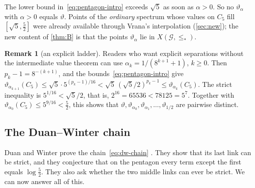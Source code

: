\documentclass[11pt]{article}
\theoremstyle{definition}
\newtheorem{remark}[theorem]{Remark}
\newcommand{\vt}{\vartheta}
\newcommand{\cG}{\mathcal G}
\newcommand{\Xs}{X(\cG,\le_*)}
\begin{document}
The lower bound in~\eqref{eq:pentagon-intro} exceeds $\sqrt5$ as soon as
$\alpha>0$.  So no $\vt_\alpha$ with $\alpha>0$ equals $\vt$.  Points of the
\emph{ordinary} spectrum whose values on $C_5$ fill $[\sqrt5,\frac52]$ were
already available through Vrana's interpolation (\cref{sec:new}); the new
content of \cref{thm:B} is that the points $\vt_\alpha$ lie in $\Xs$.

\begin{remark}[an explicit ladder]
Readers who want explicit separations without the intermediate value theorem
can use $\alpha_k=1/(8^{k+1}+1)$, $k\ge0$.  Then $p_k-1=8^{-(k+1)}$, and the
bounds~\eqref{eq:pentagon-intro} give
$\vt_{\alpha_{k+1}}(C_5)\le\sqrt5\cdot5^{(p_k-1)/16}
<\sqrt5\,(\sqrt5/2)^{p_k-1}\le\vt_{\alpha_k}(C_5)$.  The strict inequality is
$5^{1/16}<\sqrt5/2$, that is, $2^{16}=65536<78125=5^7$.  Together with
$\vt_{\alpha_0}(C_5)\le5^{9/16}<\frac52$, this shows that
$\vt,\vt_{\alpha_0},\vt_{\alpha_1},\dots,\vt_{1/2}$ are pairwise distinct.
\end{remark}

\subsection{The Duan--Winter chain}\label{sec:dw-chain}

Duan and Winter prove the chain~\eqref{eq:dw-chain}
\cite[Eq.~(54)]{DuanWinter2016}.  They show that its last link can be strict,
and they conjecture that on the pentagon every term except the first equals
$\log\frac52$.  They also ask whether the two middle links can ever be strict.
We can now answer all of this.
\end{document}
